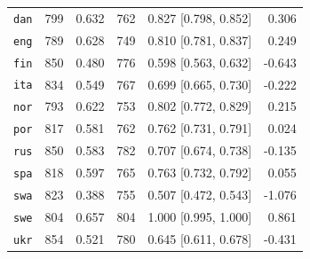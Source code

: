 \begin{table}[htbp]
\begin{minipage}[t]{0.485\linewidth}
{\begin{tabular}{@{}lrrrrr@{}}
\texttt{dan} & 799 & 0.632 & 762 & 0.827 [0.798, 0.852] & 0.306 \\
\texttt{eng} & 789 & 0.628 & 749 & 0.810 [0.781, 0.837] & 0.249 \\
\texttt{fin} & 850 & 0.480 & 776 & 0.598 [0.563, 0.632] & -0.643 \\
\texttt{ita} & 834 & 0.549 & 767 & 0.699 [0.665, 0.730] & -0.222 \\
\texttt{nor} & 793 & 0.622 & 753 & 0.802 [0.772, 0.829] & 0.215 \\
\texttt{por} & 817 & 0.581 & 762 & 0.762 [0.731, 0.791] & 0.024 \\
\texttt{rus} & 850 & 0.583 & 782 & 0.707 [0.674, 0.738] & -0.135 \\
\texttt{spa} & 818 & 0.597 & 765 & 0.763 [0.732, 0.792] & 0.055 \\
\texttt{swa} & 823 & 0.388 & 755 & 0.507 [0.472, 0.543] & -1.076 \\
\texttt{swe} & 804 & 0.657 & 804 & 1.000 [0.995, 1.000] & 0.861 \\
\texttt{ukr} & 854 & 0.521 & 780 & 0.645 [0.611, 0.678] & -0.431 \\
\bottomrule
\end{tabular}}
\end{minipage}
\end{table}

